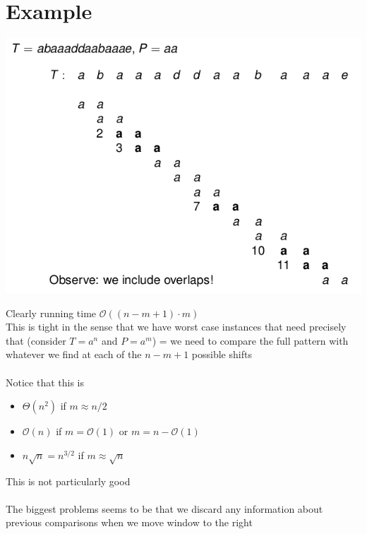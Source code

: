 \documentclass{article}[18pt]
\begin{document}
\section{Example}
\begin{center}
	\includegraphics[scale=0.7]{Example}
\end{center}
Clearly running time $\mathcal{O}((n-m+1)\cdot m)$\\
This is tight in the sense that we have worst case instances that need precisely that (consider $T=a^n$ and $P=a^m$) = we need to compare the full pattern with whatever we find at each of the $n-m+1$ possible shifts\\
\\
Notice that this is
\begin{itemize}
	\item $\Theta(n^2)$ if $m\approx n/2$
	\item $\mathcal{O}(n)$ if $m=\mathcal{O}(1)$ or $m=n-\mathcal{O}(1)$
	\item $n\sqrt{n}=n^{3/2}$ if $m\approx \sqrt{n}$
\end{itemize}
This is not particularly good\\
\\
The biggest problems seems to be that we discard any information about previous comparisons when we move window to the right
\end{document}
